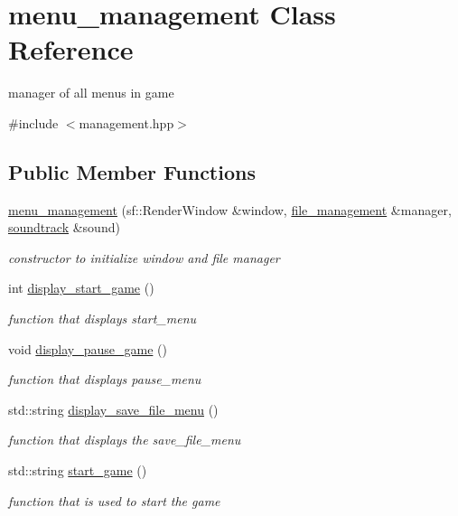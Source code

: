 \hypertarget{classmenu__management}{}\section{menu\+\_\+management Class Reference}
\label{classmenu__management}


manager of all menu\textquotesingle{}s in game  




{\ttfamily \#include $<$management.\+hpp$>$}

\subsection*{Public Member Functions}
\begin{DoxyCompactItemize}
\item 
\hyperlink{classmenu__management_abc65b2b5ef39a07120aed543db8a22b5}{menu\+\_\+management} (sf\+::\+Render\+Window \&window, \hyperlink{classfile__management}{file\+\_\+management} \&manager, \hyperlink{classsoundtrack}{soundtrack} \&sound)
\begin{DoxyCompactList}\small\item\em constructor to initialize window and file manager \end{DoxyCompactList}\item 
int \hyperlink{classmenu__management_aad6e975e03cab2478f3ebec8da7eaf7d}{display\+\_\+start\+\_\+game} ()
\begin{DoxyCompactList}\small\item\em function that displays start\+\_\+menu \end{DoxyCompactList}\item 
void \hyperlink{classmenu__management_ab7aa6674e3428604073af06efe5aa791}{display\+\_\+pause\+\_\+game} ()
\begin{DoxyCompactList}\small\item\em function that displays pause\+\_\+menu \end{DoxyCompactList}\item 
std\+::string \hyperlink{classmenu__management_ac64c1eace3d955be8623a1129597dc54}{display\+\_\+save\+\_\+file\+\_\+menu} ()
\begin{DoxyCompactList}\small\item\em function that displays the save\+\_\+file\+\_\+menu \end{DoxyCompactList}\item 
std\+::string \hyperlink{classmenu__management_a92d22f059d33ccc5c3ae485804fd5fbb}{start\+\_\+game} ()
\begin{DoxyCompactList}\small\item\em function that is used to start the game \end{DoxyCompactList}\end{DoxyCompactItemize}


